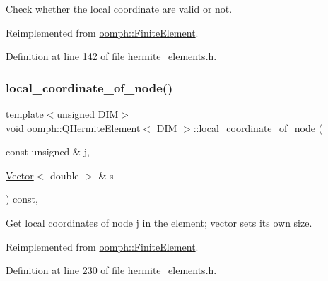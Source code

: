 Check whether the local coordinate are valid or not. 



Reimplemented from \hyperlink{classoomph_1_1FiniteElement_a9ae98c5b577d83303849ff57a9ae81f8}{oomph\+::\+Finite\+Element}.



Definition at line 142 of file hermite\+\_\+elements.\+h.

\mbox{\label{classoomph_1_1QHermiteElement_a40d6a579987b39c4427f88745de83c89}} 
\subsubsection{\texorpdfstring{local\+\_\+coordinate\+\_\+of\+\_\+node()}{local\_coordinate\_of\_node()}}
{\footnotesize\ttfamily template$<$unsigned D\+IM$>$ \\
void \hyperlink{classoomph_1_1QHermiteElement}{oomph\+::\+Q\+Hermite\+Element}$<$ D\+IM $>$\+::local\+\_\+coordinate\+\_\+of\+\_\+node (\begin{DoxyParamCaption}\item[{const unsigned \&}]{j,  }\item[{\hyperlink{classoomph_1_1Vector}{Vector}$<$ double $>$ \&}]{s }\end{DoxyParamCaption}) const\hspace{0.3cm}{\ttfamily [inline]}, {\ttfamily [virtual]}}



Get local coordinates of node j in the element; vector sets its own size. 



Reimplemented from \hyperlink{classoomph_1_1FiniteElement_a22bc4ee35e4f948d8d7fba18c7b4f4c4}{oomph\+::\+Finite\+Element}.



Definition at line 230 of file hermite\+\_\+elements.\+h.

\mbox{\label{classoomph_1_1QHermiteElement_a7265d98ba824ff594c7eae3b14ebcf46}} 

